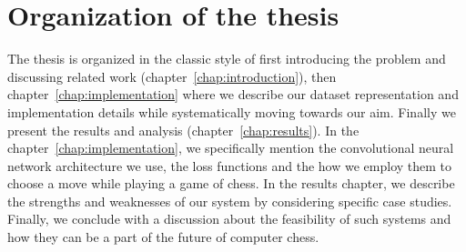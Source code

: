 \section*{Organization of the thesis}
The thesis is organized in the classic style of first introducing the problem 
and discussing related work (chapter~\ref{chap:introduction}), 
then chapter~\ref{chap:implementation} where we describe 
our dataset representation and implementation details while 
systematically moving towards our aim. Finally we present the results and 
analysis (chapter~\ref{chap:results}). In the chapter~\ref{chap:implementation}, 
we specifically mention the convolutional neural network architecture we use, 
the loss functions and the how we employ them to choose a move while playing a 
game of chess. In the results chapter, we describe the strengths and weaknesses 
of our system by considering specific case studies. Finally, we conclude with a 
discussion about the feasibility of such systems and how they can be a part of 
the future of computer chess.